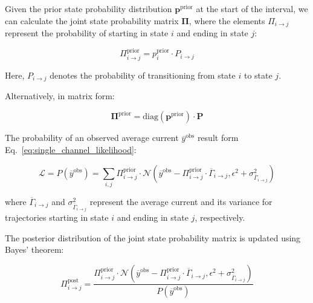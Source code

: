 \documentclass[pdflatex,sn-mathphys-num]{sn-jnl}%
\theoremstyle{thmstyleone}%
\theoremstyle{thmstyletwo}%
\theoremstyle{thmstylethree}%
\begin{document}
Given the prior state probability distribution \( \boldsymbol{p}^{\text{prior}} \) at the start of the interval, we can calculate the joint state probability matrix \( \boldsymbol{\Pi} \), where the elements \( \Pi_{i \rightarrow j} \) represent the probability of starting in state \( i \) and ending in state \( j \):

\begin{equation}
	\Pi_{i \rightarrow j}^{\text{prior}} = p^{\text{prior}}_i \cdot P_{i \rightarrow j}
	\label{eq:joint_state_probability}
\end{equation}

Here, \( P_{i \rightarrow j} \) denotes the probability of transitioning from state \( i \) to state \( j \).

Alternatively, in matrix form:

\begin{equation}
	\boldsymbol{\Pi}^{\text{prior}} = \mathrm{diag}(\boldsymbol{p}^{\text{prior}}) \cdot \mathbf{P}
	\label{eq:joint_state_probability_matrix}
\end{equation}

The probability of an observed average current \( \overline{y}^{\text{obs}} \) result form Eq.~\ref{eq:single_channel_likelihood}:

\begin{equation}
	\mathcal{L}=P(\overline{y}^{\text{obs}}) = \sum_{i, j} \Pi_{i \rightarrow j}^{\text{prior}} \cdot \mathcal{N}\left(\overline{y}^{\text{obs}} - \Pi_{i \rightarrow j}^{\text{prior}} \cdot \overline{\Gamma}_{i \rightarrow j}, \epsilon^2 + \sigma^2_{\overline{\Gamma}_{i \rightarrow j}}\right)
	\label{eq:single_channel_integrated_likelihood}
\end{equation}

where \( \overline{\Gamma}_{i \rightarrow j} \) and \( \sigma^2_{\overline{\Gamma}_{i \rightarrow j}} \) represent the average current and its variance for trajectories starting in state \( i \) and ending in state \( j \), respectively.

The posterior distribution of the joint state probability matrix is updated using Bayes' theorem:

\begin{equation}
	\Pi_{i \rightarrow j}^{\text{post}} = \frac{\Pi_{i \rightarrow j}^{\text{prior}} \cdot \mathcal{N}\left(\overline{y}^{\text{obs}} - \Pi_{i \rightarrow j}^{\text{prior}} \cdot \overline{\Gamma}_{i \rightarrow j}, \epsilon^2 + \sigma^2_{\overline{\Gamma}_{i \rightarrow j}}\right)}{P(\overline{y}^{\text{obs}})}
	\label{eq:single_channel_integrated_posterior}
\end{equation}
\end{document}
